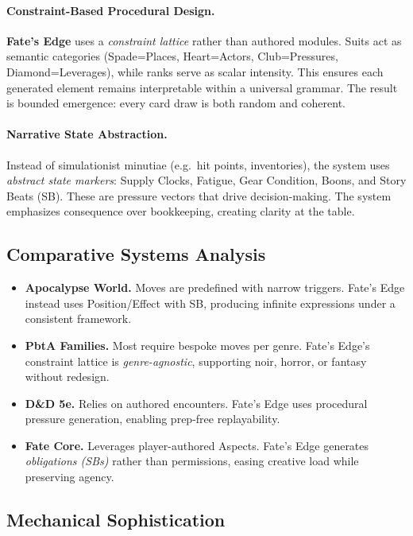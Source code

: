 \paragraph{Constraint-Based Procedural Design.}
\textbf{Fate’s Edge} uses a \emph{constraint lattice} rather than authored modules. Suits act as semantic categories (Spade=Places, Heart=Actors, Club=Pressures, Diamond=Leverages), while ranks serve as scalar intensity. This ensures each generated element remains interpretable within a universal grammar. The result is bounded emergence: every card draw is both random and coherent.

\paragraph{Narrative State Abstraction.}
Instead of simulationist minutiae (e.g.\ hit points, inventories), the system uses \emph{abstract state markers}: Supply Clocks, Fatigue, Gear Condition, Boons, and Story Beats (SB). These are pressure vectors that drive decision-making. The system emphasizes consequence over bookkeeping, creating clarity at the table.

\subsection{Comparative Systems Analysis}

\begin{itemize}
  \item \textbf{Apocalypse World.} Moves are predefined with narrow triggers. Fate’s Edge instead uses Position/Effect with SB, producing infinite expressions under a consistent framework.
  \item \textbf{PbtA Families.} Most require bespoke moves per genre. Fate’s Edge’s constraint lattice is \emph{genre-agnostic}, supporting noir, horror, or fantasy without redesign.
  \item \textbf{D\&D 5e.} Relies on authored encounters. Fate’s Edge uses procedural pressure generation, enabling prep-free replayability.
  \item \textbf{Fate Core.} Leverages player-authored Aspects. Fate’s Edge generates \emph{obligations (SBs)} rather than permissions, easing creative load while preserving agency.
\end{itemize}

\subsection{Mechanical Sophistication}

